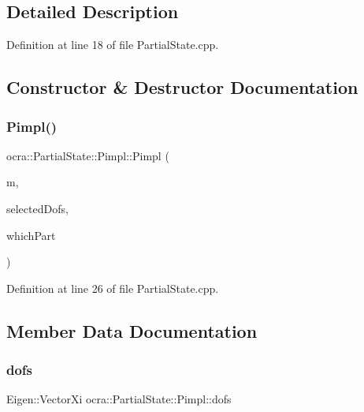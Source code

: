 \subsection{Detailed Description}


Definition at line 18 of file Partial\+State.\+cpp.



\subsection{Constructor \& Destructor Documentation}
\hypertarget{structocra_1_1PartialState_1_1Pimpl_a4f12abe2e984af1d293d847dc3456724}{}\label{structocra_1_1PartialState_1_1Pimpl_a4f12abe2e984af1d293d847dc3456724} 
\subsubsection{\texorpdfstring{Pimpl()}{Pimpl()}}
{\footnotesize\ttfamily ocra\+::\+Partial\+State\+::\+Pimpl\+::\+Pimpl (\begin{DoxyParamCaption}\item[{const Model \&}]{m,  }\item[{const Eigen\+::\+Vector\+Xi \&}]{selected\+Dofs,  }\item[{int}]{which\+Part }\end{DoxyParamCaption})\hspace{0.3cm}{\ttfamily [inline]}}



Definition at line 26 of file Partial\+State.\+cpp.



\subsection{Member Data Documentation}
\hypertarget{structocra_1_1PartialState_1_1Pimpl_a206c2d1097d24706e5bf2d3a9b0862a8}{}\label{structocra_1_1PartialState_1_1Pimpl_a206c2d1097d24706e5bf2d3a9b0862a8} 
\subsubsection{\texorpdfstring{dofs}{dofs}}
{\footnotesize\ttfamily Eigen\+::\+Vector\+Xi ocra\+::\+Partial\+State\+::\+Pimpl\+::dofs}



